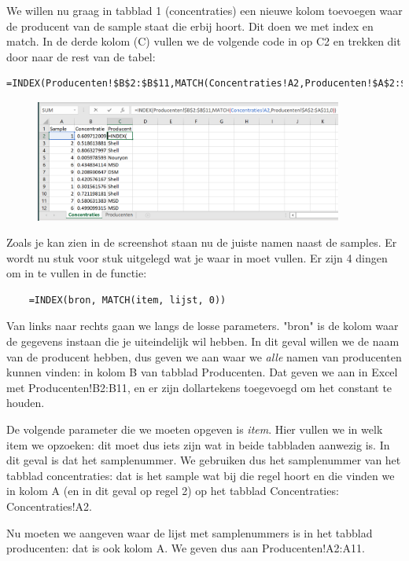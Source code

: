 We willen nu graag in tabblad 1 (concentraties) een nieuwe kolom toevoegen waar de producent van de sample staat die erbij hoort. Dit doen we met index en match. In de derde kolom (C) vullen we de volgende code in op C2 en trekken dit door naar de rest van de tabel:
\begin{verbatim}
=INDEX(Producenten!$B$2:$B$11,MATCH(Concentraties!A2,Producenten!$A$2:$A$11,0))
\end{verbatim}

\begin{figure}[h]
\begin{center}
\includegraphics[width=0.9\textwidth]{img/index3.png}
\end{center}
\end{figure}

Zoals je kan zien in de screenshot staan nu de juiste namen naast de samples. Er wordt nu stuk voor stuk uitgelegd wat je waar in moet vullen. Er zijn 4 dingen om in te vullen in de functie:

\begin{verbatim}
    =INDEX(bron, MATCH(item, lijst, 0))
\end{verbatim}
Van links naar rechts gaan we langs de losse parameters. "bron" is de kolom waar de gegevens instaan die je uiteindelijk wil hebben. In dit geval willen we de naam van de producent hebben, dus geven we aan waar we \textit{alle} namen van producenten kunnen vinden: in kolom B van tabblad Producenten. Dat geven we aan in Excel met \textsf{Producenten!B2:B11}, en er zijn dollartekens toegevoegd om het constant te houden. 

De volgende parameter die we moeten opgeven is \textit{item}. Hier vullen we in welk item we opzoeken: dit moet dus iets zijn wat in beide tabbladen aanwezig is. In dit geval is dat het samplenummer. We gebruiken dus het samplenummer van het tabblad concentraties: dat is het sample wat bij die regel hoort en die vinden we in kolom A (en in dit geval op regel 2) op het tabblad Concentraties: Concentraties!A2.

Nu moeten we aangeven waar de lijst met samplenummers is in het tabblad producenten: dat is ook kolom A. We geven dus aan Producenten!A2:A11. 

